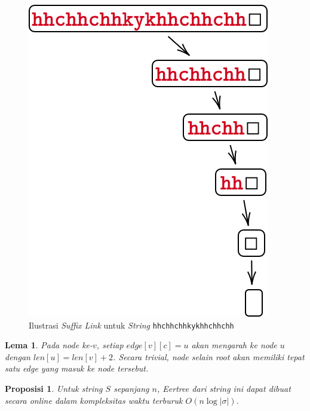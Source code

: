\documentclass[11pt, a4paper, final]{article}
\newtheorem{lemma}[theorem]{Lema}
\newtheorem{proposition}[theorem]{Proposisi}
\begin{document}
\begin{figure}[H]
\centering
\includegraphics[scale=0.35]{assets/suffixLink.png}
\caption{Ilustrasi \textit{Suffix Link} untuk \textit{String} \texttt{hhchhchhkykhhchhchh}}
\end{figure}

\begin{lemma}
\label{levelNode}
Pada \textit{node} ke-$v$, setiap $edge[v][c] = u$ akan mengarah ke \textit{node} $u$ dengan $len[u] = len[v] + 2$. Secara trivial, \textit{node} selain \textit{root} akan memiliki tepat satu \textit{edge} yang masuk ke \textit{node} tersebut.
\end{lemma}

\begin{proposition}
Untuk \textit{string} $S$ sepanjang $n$, Eertree dari \textit{string} ini dapat dibuat secara \textit{online} dalam kompleksitas waktu terburuk $O(n \log |\sigma|)$.
\end{proposition}
\end{document}

